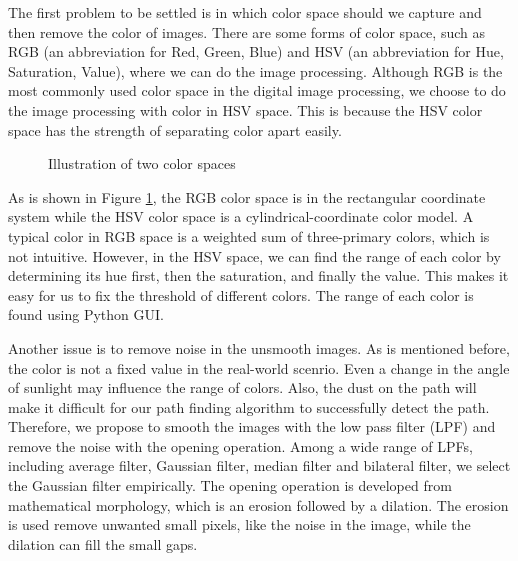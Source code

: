 The first problem to be settled is in which color space should we capture and then remove the color of images. There are some forms of color space, such as RGB (an abbreviation for Red, Green, Blue) and HSV (an abbreviation for Hue, Saturation, Value), where we can do the image processing. Although RGB is the most commonly used color space in the digital image processing, we choose to do the image processing with color in HSV space. This is because the HSV color space has the strength of separating color apart easily. 

\begin{figure}[htbp]
	\centering
	\caption{Illustration of two color spaces}
	\label{fig:Color Space}
\end{figure}

As is shown in Figure \ref{fig:Color Space}, the RGB color space is in the rectangular coordinate system while the HSV color space is a cylindrical-coordinate color model.  A typical color in RGB space is a weighted sum of three-primary colors, which is not intuitive. However, in the HSV space, we can find the range of each color by determining its hue first, then the saturation, and finally the value. This makes it easy for us to fix the threshold of different colors. The range of each color is found using Python GUI.

Another issue is to remove noise in the unsmooth images. As is mentioned before, the color is not a fixed value in the real-world scenrio. Even a change in the angle of sunlight may influence the range of colors. Also, the dust on the path will make it difficult for our path finding algorithm to successfully detect the path. Therefore, we propose to smooth the images with the low pass filter (LPF) and remove the noise with the opening operation. Among a wide range of LPFs, including average filter, Gaussian filter, median filter and bilateral filter, we select the Gaussian filter empirically\cite{basu2002gaussian}. The opening operation is developed from mathematical morphology, which is an erosion followed by a dilation. The erosion is used remove unwanted small pixels, like the noise in the image, while the dilation can fill the small gaps.

